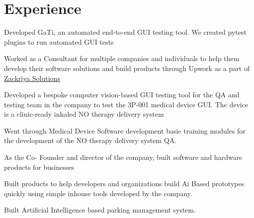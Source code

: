 \documentclass[]{plushcv}
\begin{document}
\begin{minipage}[t]{0.70\textwidth} 



\section{Experience}
\vspace{\topsep} %
\begin{tightemize}
\sectionsep
\item Developed GaTi, an automated end-to-end GUI testing tool. We created pytest plugins to run automated GUI tests
\item Worked as a Consultant for multiple companies and individuals to help them develop their software solutions and build products through Upwork as a part of \href{https://www.upwork.com/agencies/~0196ee486b8dcec20e}{Zackriya Solutions}
\end{tightemize}
\sectionsep

\begin{tightemize}
\sectionsep
\item Developed a bespoke computer vision-based GUI testing tool for the QA and testing team in the company to test the 3P-001 medical device GUI. The device is a clinic-ready inhaled NO therapy delivery system
\item Went through Medical Device Software development basic training modules for the development of the NO therapy delivery system QA.
\end{tightemize}
\sectionsep

\begin{tightemize}
\sectionsep
\item As the Co- Founder and director of the company, built software and hardware products for businesses
\item Built products to help developers and organizations build Ai Based prototypes quickly using simple inhouse tools developed by the company.
\item Built Artificial Intelligence based parking management system.
\end{tightemize}
\sectionsep


\end{minipage}
\end{document}
